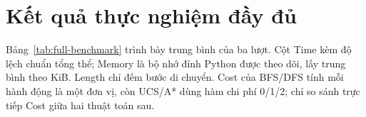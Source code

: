 \clearpage
\section{Kết quả thực nghiệm đầy đủ}

Bảng~\ref{tab:full-benchmark} trình bày trung bình của ba lượt. Cột Time kèm độ
lệch chuẩn tổng thể; Memory là bộ nhớ đỉnh Python được theo dõi, lấy trung bình
theo KiB. Length chỉ đếm bước di chuyển. Cost của BFS/DFS tính mỗi hành động
là một đơn vị, còn UCS/A* dùng hàm chi phí 0/1/2; chỉ so sánh trực tiếp Cost
giữa hai thuật toán sau.


